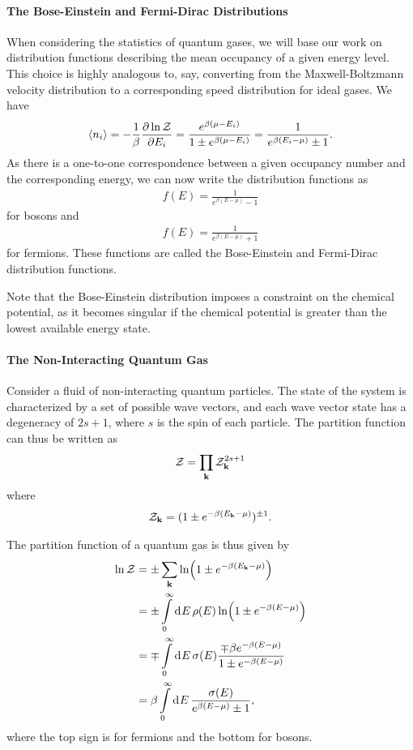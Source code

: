 \paragraph{The Bose-Einstein and Fermi-Dirac Distributions}
When considering the statistics of quantum gases, we will base our work on distribution functions describing the mean occupancy of a given energy level. This choice is highly analogous to, say, converting from the Maxwell-Boltzmann velocity distribution to a corresponding speed distribution for ideal gases. We have
\begin{align*}
	\expval{n_{i}} = -\frac{1}{\beta}\pdv{\ln{\mathcal{Z}}}{E_{i}} = \frac{e^{\beta(\mu - E_{i})}}{1 \pm e^{\beta(\mu - E_{i})}} = \frac{1}{e^{\beta(E_{i} - \mu)} \pm 1}.
\end{align*}
As there is a one-to-one correspondence between a given occupancy number and the corresponding energy, we can now write the distribution functions as
\begin{align*}
	f(E) = \frac{1}{e^{\beta(E - \mu)} - 1}
\end{align*}
for bosons and
\begin{align*}
	f(E) = \frac{1}{e^{\beta(E - \mu)} + 1}
\end{align*}
for fermions. These functions are called the Bose-Einstein and Fermi-Dirac distribution functions.

Note that the Bose-Einstein distribution imposes a constraint on the chemical potential, as it becomes singular if the chemical potential is greater than the lowest available energy state.

\paragraph{The Non-Interacting Quantum Gas}
Consider a fluid of non-interacting quantum particles. The state of the system is characterized by a set of possible wave vectors, and each wave vector state has a degeneracy of $2s + 1$, where $s$ is the spin of each particle. The partition function can thus be written as
\begin{align*}
	\mathcal{Z} = \prod\limits_{\vb{k}}\mathcal{Z}_{\vb{k}}^{2s + 1}
\end{align*}
where
\begin{align*}
	\mathcal{Z}_{\vb{k}} = (1 \pm e^{-\beta(E_{\vb{k}} - \mu)})^{\pm 1}.
\end{align*}

The partition function of a quantum gas is thus given by
\begin{align*}
	\ln{\mathcal{Z}} &= \pm\sum\limits_{\vb{k}}\ln(1 \pm e^{-\beta(E_{\vb{k}} - \mu)}) \\
	        &= \pm\int\limits_{0}^{\infty}\dd[]{E}\rho(E)\ln(1 \pm e^{-\beta(E - \mu)}) \\
	        &= \mp\int\limits_{0}^{\infty}\dd[]{E}\sigma(E)\frac{\mp\beta e^{-\beta(E - \mu)}}{1 \pm e^{-\beta(E - \mu)}} \\
	        &= \beta\int\limits_{0}^{\infty}\dd[]{E}\frac{\sigma(E)}{e^{\beta(E - \mu)} \pm 1},
\end{align*}
where the top sign is for fermions and the bottom for bosons.

